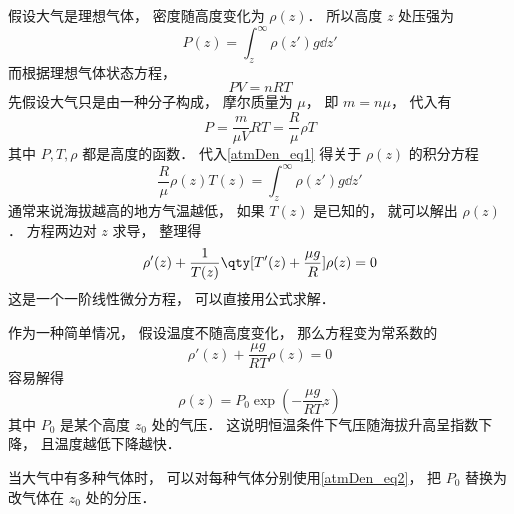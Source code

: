 

假设大气是理想气体， 密度随高度变化为 $\rho(z)$． 所以高度 $z$ 处压强为
\begin{equation}\label{atmDen_eq1}
P(z) = \int_{z}^\infty \rho(z') g \dd{z'}
\end{equation}
而根据理想气体状态方程，
\begin{equation}
PV = n R T
\end{equation}
先假设大气只是由一种分子构成， 摩尔质量为 $\mu$， 即 $m = n\mu$， 代入有
\begin{equation}
P = \frac{m}{\mu V} RT = \frac{R}{\mu} \rho T
\end{equation}
其中 $P, T, \rho$ 都是高度的函数． 代入\autoref{atmDen_eq1} 得关于 $\rho(z)$ 的积分方程
\begin{equation}
\frac{R}{\mu} \rho(z) T(z) = \int_{z}^\infty \rho(z') g \dd{z'}
\end{equation}
通常来说海拔越高的地方气温越低， 如果 $T(z)$ 是已知的， 就可以解出 $\rho(z)$． 方程两边对 $z$ 求导， 整理得
\begin{equation}
\rho'(z)  +  \frac{1}{T(z)}\qty[T'(z) + \frac{\mu g}{R}]\rho(z) = 0
\end{equation}
这是一个一阶线性微分方程， 可以直接用公式求解．

作为一种简单情况， 假设温度不随高度变化， 那么方程变为常系数的
\begin{equation}
\rho'(z)  +  \frac{\mu g}{RT}\rho(z) = 0
\end{equation}
容易解得
\begin{equation}\label{atmDen_eq2}
\rho(z) = P_0\exp(-\frac{\mu g}{RT} z)
\end{equation}
其中 $P_0$ 是某个高度 $z_0$ 处的气压． 这说明恒温条件下气压随海拔升高呈指数下降， 且温度越低下降越快．

当大气中有多种气体时， 可以对每种气体分别使用\autoref{atmDen_eq2}， 把 $P_0$ 替换为改气体在 $z_0$ 处的分压．
